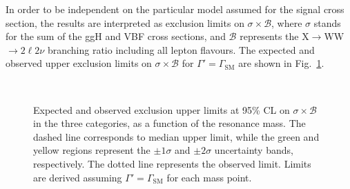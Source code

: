 In order to be independent on the particular model assumed for the signal cross section, the results are interpreted as exclusion limits on $\sigma \times \mathcal{B}$, where $\sigma$ stands for the sum of the ggH and VBF cross sections, and $\mathcal{B}$ represents the X$\to$WW$\to2\ell2\nu$ branching ratio including all lepton flavours. The expected and observed upper exclusion limits on $\sigma \times \mathcal{B}$ for $\Gamma' = \Gamma_\mathrm{SM}$ are shown in Fig.~\ref{fig:13TeVobslim}.

\begin{figure}[htb]
\centering
{}
\\
\caption{Expected and observed exclusion upper limits at 95\% CL on $\sigma \times \mathcal{B}$ in the three categories, as a function of the resonance mass. The dashed line corresponds to median upper limit, while the green and yellow regions represent the $\pm 1\sigma$ and $\pm 2 \sigma$ uncertainty bands, respectively. The dotted line represents the observed limit. Limits are derived assuming $\Gamma' = \Gamma_\mathrm{SM}$ for each mass point.}\label{fig:13TeVobslim}
\end{figure}

